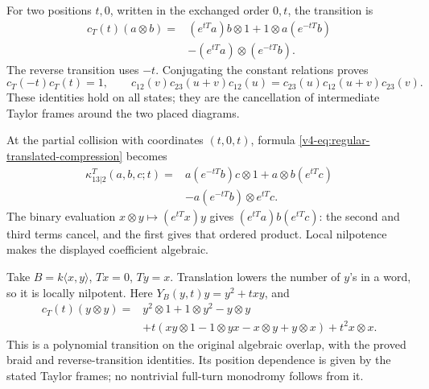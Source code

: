 For two positions \(t,0\), written in the exchanged
order \(0,t\), the transition is
\begin{equation}\label{v4-eq:regular-spectral-exchange}
 \begin{split}
 c_T(t)(a\otimes b)
       ={}&(e^{tT}a)b\otimes1
           +1\otimes a(e^{-tT}b)\\
         &-(e^{tT}a)\otimes(e^{-tT}b).
 \end{split}
\end{equation}
The reverse transition uses \(-t\). Conjugating
the constant relations proves
\[
 c_T(-t)c_T(t)=1,
 \qquad
 c_{12}(v)c_{23}(u+v)c_{12}(u)
       =c_{23}(u)c_{12}(u+v)c_{23}(v).
\]
These identities hold on all states; they are
the cancellation of intermediate Taylor frames
around the two placed diagrams.

At the partial collision with coordinates
\((t,0,t)\), formula
\eqref{v4-eq:regular-translated-compression} becomes
\begin{equation}\label{v4-eq:regular-translated-three}
 \begin{split}
 \kappa_{13|2}^T(a,b,c;t)
       ={}&a(e^{-tT}b)c\otimes1
                +a\otimes b(e^{tT}c)\\
          &-a(e^{-tT}b)\otimes e^{tT}c.
 \end{split}
\end{equation}
The binary evaluation
\(x\otimes y\mapsto(e^{tT}x)y\)
gives \((e^{tT}a)b(e^{tT}c)\):
the second and third terms cancel, and the first
gives that ordered product. Local nilpotence
makes the displayed coefficient algebraic.

\begin{example}
\label{v4-ex:regular-polynomial-exchange}
Take \(B=k\langle x,y\rangle\), \(Tx=0\), \(Ty=x\).
Translation lowers the number of \(y\)'s in a word,
so it is locally nilpotent. Here
\(Y_B(y,t)y=y^2+txy\), and
\[
 \begin{split}
 c_T(t)(y\otimes y)
       ={}&y^2\otimes1+1\otimes y^2-y\otimes y\\
          &+t(xy\otimes1-1\otimes yx
                         -x\otimes y+y\otimes x)
             +t^2x\otimes x.
 \end{split}
\]
This is a polynomial transition on the original
algebraic overlap, with the proved braid and
reverse-transition identities. Its position
dependence is given by the stated Taylor frames;
no nontrivial full-turn monodromy follows from it.
\end{example}

